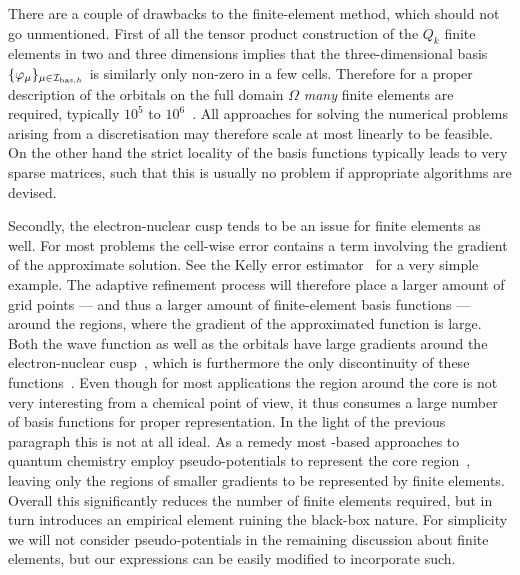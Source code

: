 There are a couple of drawbacks to the finite-element method,
which should not go unmentioned.
First of all the tensor product construction of the $Q_k$ finite elements
in two and three dimensions
implies that
the three-dimensional \FE basis $\{\varphi_\mu\}_{\mu\in\mathcal{I}_{\text{bas},h}}$
is similarly only non-zero in a few cells.
Therefore for a proper description of the \HF orbitals
on the full domain $\Omega$
\emph{many} finite elements are required,
typically $10^5$ to $10^6$~\cite{Davydov2015}.
All approaches for solving the numerical problems arising from a \FE
discretisation may therefore scale at most linearly to be feasible.
On the other hand the strict locality of the \FE basis functions
typically leads to very sparse matrices, such that this is usually
no problem if appropriate algorithms are devised.

Secondly, the electron-nuclear cusp tends to be an issue
for finite elements as well.
For most problems the cell-wise error contains
a term involving the gradient of the approximate solution.
See the Kelly error estimator~\cite{KellyError} for a very simple example.
The adaptive refinement process
will therefore place a larger amount of grid points
--- and thus a larger amount of finite-element basis functions ---
around the regions,
where the gradient of the approximated function is large.
Both the wave function as well as the \HF orbitals
have large gradients around the electron-nuclear cusp~\cite{Kato1957},
which is furthermore the only discontinuity of these functions~\cite{Kato1951}.
Even though for most applications the region around the core
is not very interesting from a chemical point of view,
it thus consumes a large number of \FE basis functions
for proper representation.
In the light of the previous paragraph this is not at all ideal.
As a remedy most \FE-based approaches to quantum chemistry employ pseudo-potentials
to represent the core region~\cite{Davydov2015},
leaving only the regions of smaller gradients
to be represented by finite elements.
Overall this significantly reduces the number of finite elements required,
but in turn introduces an empirical element ruining the black-box nature.
For simplicity we will not consider pseudo-potentials
in the remaining discussion about finite elements,
but our expressions can be easily modified to incorporate such.

